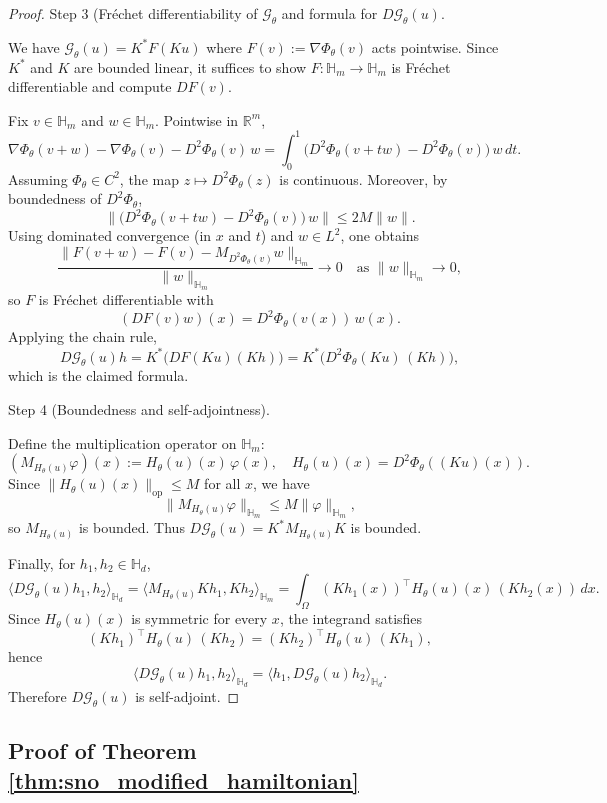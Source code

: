 \documentclass{article}
\theoremstyle{plain}
\theoremstyle{definition}
\theoremstyle{remark}
\newcommand{\inner}[2]{\langle #1, #2 \rangle}
\newcommand{\Hd}{\mathbb{H}_d}
\newcommand{\Hm}{\mathbb{H}_m}
\newcommand{\op}{\mathrm{op}}
\begin{document}
\begin{proof}
Step 3 (Fr\'echet differentiability of $\mathcal{G}_\theta$ and formula for $D\mathcal{G}_\theta(u)$.

We have $\mathcal{G}_\theta(u)=K^*F(Ku)$ where $F(v):=\nabla\Phi_\theta(v)$ acts pointwise.
Since $K^*$ and $K$ are bounded linear, it suffices to show $F:\Hm\to\Hm$ is Fr\'echet differentiable and compute $DF(v)$.

Fix $v\in\Hm$ and $w\in\Hm$. Pointwise in $\mathbb{R}^m$,
\[
\nabla\Phi_\theta(v+w)-\nabla\Phi_\theta(v) - D^2\Phi_\theta(v)\,w
= \int_0^1 \big(D^2\Phi_\theta(v+t w)-D^2\Phi_\theta(v)\big)\,w\,dt.
\]
Assuming $\Phi_\theta\in C^2$, the map $z\mapsto D^2\Phi_\theta(z)$ is continuous.
Moreover, by boundedness of $D^2\Phi_\theta$,
\[
\|\big(D^2\Phi_\theta(v+t w)-D^2\Phi_\theta(v)\big)\,w\|
\le 2M\|w\|.
\]
Using dominated convergence (in $x$ and $t$) and $w\in L^2$, one obtains
\[
\frac{\|F(v+w)-F(v)-M_{D^2\Phi_\theta(v)}w\|_{\Hm}}{\|w\|_{\Hm}}\to 0
\quad\text{as }\|w\|_{\Hm}\to 0,
\]
so $F$ is Fr\'echet differentiable with
\[
(DF(v)w)(x)=D^2\Phi_\theta(v(x))\,w(x).
\]
Applying the chain rule,
\[
D\mathcal{G}_\theta(u)h
=K^*\big(DF(Ku)(Kh)\big)
=K^*\big(D^2\Phi_\theta(Ku)\,(Kh)\big),
\]
which is the claimed formula.

Step 4 (Boundedness and self-adjointness).

Define the multiplication operator on $\Hm$:
\[
(M_{H_\theta(u)}\varphi)(x):=H_\theta(u)(x)\,\varphi(x),
\quad H_\theta(u)(x)=D^2\Phi_\theta((Ku)(x)).
\]
Since $\|H_\theta(u)(x)\|_{\op}\le M$ for all $x$, we have
\[
\|M_{H_\theta(u)}\varphi\|_{\Hm}\le M\|\varphi\|_{\Hm},
\]
so $M_{H_\theta(u)}$ is bounded.
Thus $D\mathcal{G}_\theta(u)=K^*M_{H_\theta(u)}K$ is bounded.

Finally, for $h_1,h_2\in\Hd$,
\[
\inner{D\mathcal{G}_\theta(u)h_1}{h_2}_{\Hd}
=\inner{M_{H_\theta(u)}Kh_1}{Kh_2}_{\Hm}
=\int_\Omega (Kh_1(x))^\top H_\theta(u)(x)\,(Kh_2(x))\,dx.
\]
Since $H_\theta(u)(x)$ is symmetric for every $x$, the integrand satisfies
\[
(Kh_1)^\top H_\theta(u)\,(Kh_2)=(Kh_2)^\top H_\theta(u)\,(Kh_1),
\]
hence
\[
\inner{D\mathcal{G}_\theta(u)h_1}{h_2}_{\Hd}
=\inner{h_1}{D\mathcal{G}_\theta(u)h_2}_{\Hd}.
\]
Therefore $D\mathcal{G}_\theta(u)$ is self-adjoint.
\end{proof}



\subsection{Proof of Theorem \ref{thm:sno_modified_hamiltonian}}
\end{document}
